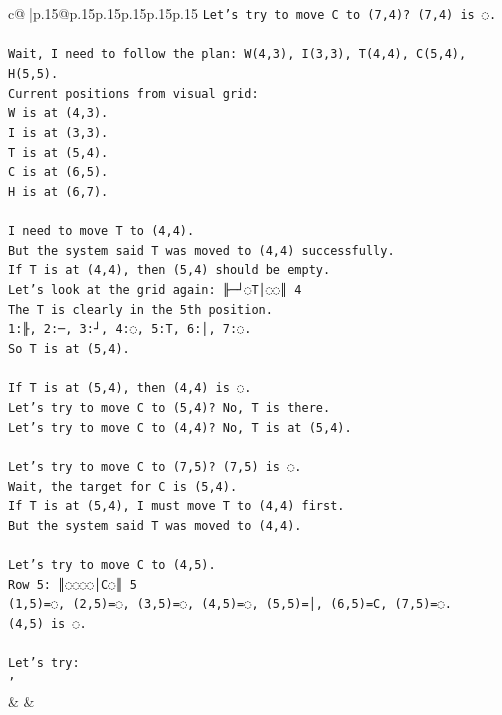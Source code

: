 \documentclass{article}
\begin{document}
{\begin{supertabular}{c@{$\;$}|p{.15\linewidth}@{}p{.15\linewidth}p{.15\linewidth}p{.15\linewidth}p{.15\linewidth}p{.15\linewidth}}
{{{\texttt{Let's try to move C to (7,4)? (7,4) is ◌.} \\
\\ 
\texttt{Wait, I need to follow the plan: W(4,3), I(3,3), T(4,4), C(5,4), H(5,5).} \\
\texttt{Current positions from visual grid:} \\
\texttt{W is at (4,3).} \\
\texttt{I is at (3,3).} \\
\texttt{T is at (5,4).} \\
\texttt{C is at (6,5).} \\
\texttt{H is at (6,7).} \\
\\ 
\texttt{I need to move T to (4,4).} \\
\texttt{But the system said T was moved to (4,4) successfully.} \\
\texttt{If T is at (4,4), then (5,4) should be empty.} \\
\texttt{Let's look at the grid again: ╟─┘◌T│◌◌║ 4} \\
\texttt{The T is clearly in the 5th position.} \\
\texttt{1:╟, 2:─, 3:┘, 4:◌, 5:T, 6:│, 7:◌.} \\
\texttt{So T is at (5,4).} \\
\\ 
\texttt{If T is at (5,4), then (4,4) is ◌.} \\
\texttt{Let's try to move C to (5,4)? No, T is there.} \\
\texttt{Let's try to move C to (4,4)? No, T is at (5,4).} \\
\\ 
\texttt{Let's try to move C to (7,5)? (7,5) is ◌.} \\
\texttt{Wait, the target for C is (5,4).} \\
\texttt{If T is at (5,4), I must move T to (4,4) first.} \\
\texttt{But the system said T was moved to (4,4).} \\
\\ 
\texttt{Let's try to move C to (4,5).} \\
\texttt{Row 5: ║◌◌◌◌│C◌║ 5} \\
\texttt{(1,5)=◌, (2,5)=◌, (3,5)=◌, (4,5)=◌, (5,5)=│, (6,5)=C, (7,5)=◌.} \\
\texttt{(4,5) is ◌.} \\
\\ 
\texttt{Let's try:} \\
\texttt{'} \\
            }
        }
    }
    & & \\ \\


\end{supertabular}}
\end{document}

